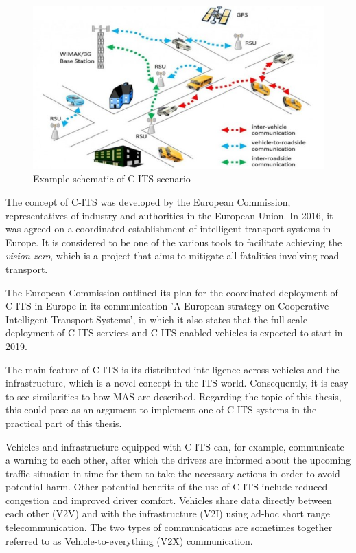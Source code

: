 \documentclass[main.tex]{subfiles}
\begin{document}
\begin{figure}[htbp]
    \centering
    \includegraphics[width=.8\textwidth]{c-its.jpg}
    \caption{Example schematic of C-ITS scenario}
    \label{c-its}
\end{figure}

The concept of C-ITS was developed by the European Commission, representatives of industry and 
authorities in the European Union. In 2016, it was agreed on a coordinated establishment of intelligent
transport systems in Europe. It is considered to be one of the various tools to facilitate achieving 
the \emph{vision zero}, which is a project that aims to mitigate all fatalities involving road 
transport.

The European Commission outlined its plan for the coordinated deployment of C-ITS in Europe in
its communication 'A European strategy on Cooperative Intelligent Transport Systems', in which
it also states that the full-scale deployment of C-ITS services and C-ITS enabled vehicles is
expected to start in 2019.

The main feature of C-ITS is its distributed intelligence across vehicles and the infrastructure, 
which is a novel concept in the ITS world. Consequently, it is easy to see similarities to how 
MAS are described. Regarding the topic of this thesis, this could pose as an argument to
implement one of C-ITS systems in the practical part of this thesis.

Vehicles and infrastructure equipped with C-ITS can, for example, communicate a warning to each
other, after which the drivers are informed about the upcoming traffic situation in time for
them to take the necessary actions in order to avoid potential harm. Other potential benefits
of the use of C-ITS include reduced congestion and improved driver comfort. Vehicles 
share data directly between each other (V2V) and with the infrastructure (V2I) using ad-hoc
short range telecommunication. The two types of communications are sometimes together referred 
to as Vehicle-to-everything (V2X) communication.
\end{document}
